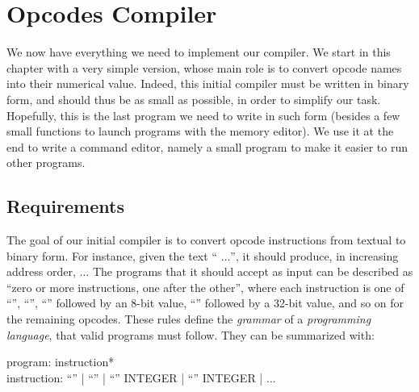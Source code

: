 
\renewcommand{\rustfile}{chapter3}
\setcounter{rustid}{0}


\chapter{Opcodes Compiler}\label{chapter:opcodes-compiler}

We now have everything we need to implement our compiler. We start in this
chapter with a very simple version, whose main role is to convert opcode names
into their numerical value. Indeed, this initial compiler must be written in
binary form, and should thus be as small as possible, in order to simplify our
task. Hopefully, this is the last program we need to write in such form
(besides a few small functions to launch programs with the memory editor). We
use it at the end to write a command editor, namely a small program to make it
easier to run other programs.

\section{Requirements}\label{section:toyc0-requirements}

The goal of our initial compiler is to convert opcode instructions from textual
to binary form. For instance, given the text ``  
    $\ldots$'', it should produce, in
increasing address order,     
  $\ldots$ The programs that it should accept as input can
be described as ``zero or more instructions, one after the other'', where each
instruction is one of ``'', ``'', ``''
followed by an 8-bit value, ``'' followed by a 32-bit value, and so
on for the remaining opcodes. These rules define the {\em grammar} of a {\em
programming language}, that valid programs must follow. They can be summarized
with:

\begin{Paragraph}
program: instruction*\\
instruction: ``'' | ``'' | ``'' INTEGER |
``'' INTEGER | $\ldots$
\end{Paragraph}

